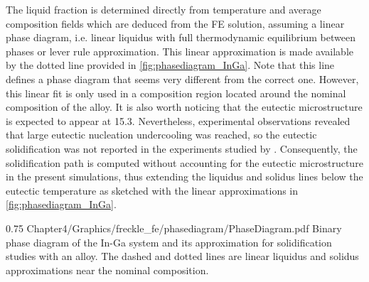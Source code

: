The liquid fraction is determined directly from temperature and average composition fields which are deduced from the FE solution, 
assuming a linear phase diagram, i.e. linear liquidus with full thermodynamic equilibrium between phases or lever rule approximation. 
This linear approximation is made available by 
the dotted line provided in \cref{fig:phasediagram_InGa}. Note that this line defines a phase diagram that seems very different from the correct one. 
However, this linear fit is only used in a composition region located around the nominal composition of the alloy. It is also worth 
noticing that the eutectic microstructure is expected to appear at \SI{15.3}{\udegC}. Nevertheless, experimental observations revealed that large 
eutectic nucleation undercooling was reached, so the eutectic solidification was not reported in the experiments studied by 
\citet{shevchenko_chimney_2013}. Consequently, the solidification path is computed without accounting for the eutectic microstructure 
in the present simulations, thus extending the liquidus and solidus lines below the eutectic temperature as sketched with the linear 
approximations in \cref{fig:phasediagram_InGa}.

\begin{figureth}
{0.75}
{Chapter4/Graphics/freckle_fe/phasediagram/PhaseDiagram.pdf}
{Binary phase diagram of the In-Ga system \citep{andersson_thermo-calc_2002,tcbin_tcbin:_2006} and 
its approximation for solidification studies with an  alloy. 
The dashed and dotted lines are linear liquidus and solidus approximations near the nominal composition.}
\label{fig:phasediagram_InGa}
\end{figureth}


